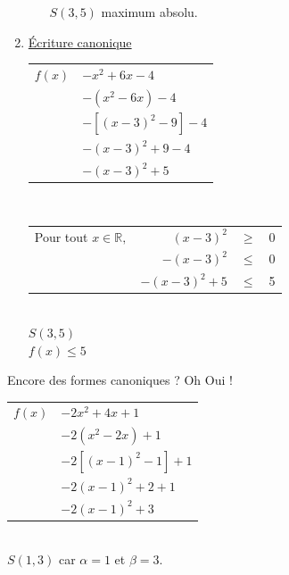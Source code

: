 \begin{enumerate}
\begin{itemize}
$S(3,5)$ maximum absolu. \\
\end{itemize}

\item \underline{Écriture canonique}

\begin{tabular}{r@{$=\;$}l}
$f(x)$ & $ -x^2 + 6x        -4 $ \\
       & $ -( x^2 -6x)      -4 $ \\
       & $ -[ (x - 3)^2 -9] -4 $ \\
       & $ -(x -3)^2    +9  -4 $ \\
       & $ - (x - 3)^2 + 5 $ \\
\end{tabular}\\

\begin{tabular}{r@{$\!\!\!\!\!\!\!\!\!\!\!\!\!\!$}r@{$\;\;$}c@{}l}
Pour tout $ x \in \mathbb{R}, $ 
       & $   (x - 3)^2 $ & $ \geqslant $ & 0 \\
       & $ - (x - 3)^2 $ & $ \leqslant $ & 0 \\
       & $ - (x - 3)^2 + 5$ & $ \leqslant $ & 5 \\
\end{tabular}\\

$S(3, 5)$ \\

$f(x) \leqslant 5$ \\


 
\end{enumerate}


\newpage

Encore des formes canoniques ? Oh Oui ! \\

\begin{tabular}{r@{$=\;$}l}
$f(x)$ & $ -2x^2 + 4x        +1 $ \\
       & $ -2( x^2 -2x)      +1 $ \\
       & $ -2[ (x - 1)^2 -1] +1 $ \\
       & $ -2(x -1)^2    +2  +1 $ \\
       & $ -2(x - 1)^2 + 3 $ \\
\end{tabular}\\

$S(1,3)$ car $\alpha = 1$ et $\beta = 3$.\\

